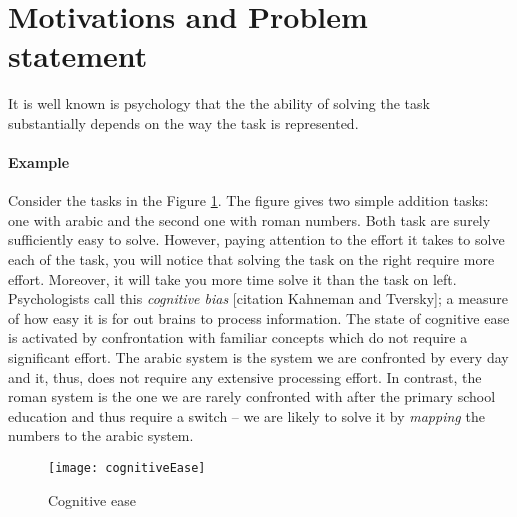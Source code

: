 








\section{Motivations and Problem statement}

It is well known is psychology that the the ability of solving the task substantially depends on the way the task is represented.

\paragraph{Example} Consider the tasks in the Figure \ref{fig:cogease}.
The figure gives two simple addition tasks: one with arabic and the second one with roman numbers.
Both task are surely sufficiently easy to solve. 
However, paying attention to the effort it takes to solve each of the task, you will notice that solving the task on the right require more effort.
Moreover, it will take you more time solve it than the task on left.
Psychologists call this \textit{cognitive bias} [citation Kahneman and Tversky]; a measure of how easy it is for out brains to process information.
The state of cognitive ease is activated by confrontation with familiar concepts which do not require a significant effort.
The arabic system is the system we are confronted by every day and it, thus, does not require any extensive processing effort.
In contrast, the roman system is the one we are rarely confronted with after the primary school education and thus require a switch -- we are likely to solve it by \textit{mapping} the numbers to the arabic system.


 


\begin{figure}
	\centering
	\texttt{[image: cognitiveEase]}
	\caption{Cognitive ease}
	\label{fig:cogease}
\end{figure}



